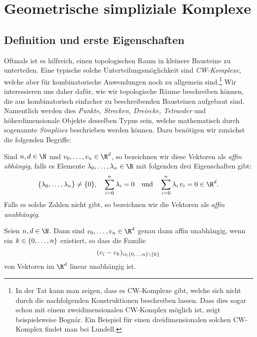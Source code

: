 \chapter{Geometrische simpliziale Komplexe}
\section{Definition und erste Eigenschaften} %
Oftmals ist es hilfreich, einen topologischen Raum in kleinere Bausteine zu
unterteilen. Eine typische solche Unterteilungsmöglichkeit sind \emph{CW-Komplexe}, welche
aber für kombinatorische Anwendungen noch zu allgemein sind.\footnote{%
    In der Tat kann man zeigen, dass es CW-Komplexe gibt, welche sich nicht
    durch die nachfolgenden Konstruktionen beschreiben lassen. Dass dies sogar
    schon mit einem zweidimensionalen CW-Komplex möglich ist, zeigt
    beispielsweise Bognár\cite{artcle:bognar77}. Ein Beispiel für einen
    dreidimensionalen solchen CW-Komplex findet man bei
    Lundell\cite[Ch.\,III,]{bookc:lundell69}.%
}
Wir interessieren uns daher dafür, wie wir topologische Räume beschreiben
können, die aus kombinatorisch einfacher zu beschreibenden Bausteinen aufgebaut
sind. Namentlich werden dies \emph{Punkte, Strecken, Dreiecke, Tetraeder} und
höherdimensionale Objekte desselben Typus sein, welche mathematisch durch
sogenannte \emph{Simplizes} beschrieben werden können. Dazu benötigen wir
zunächst die folgenden Begriffe:

\begin{thDef}
    Sind $n,d\in\N$ und $v_0,\ldots,v_n\in\R^d$, so bezeichnen wir diese
    Vektoren als \emph{affin abhängig}, falls es Elemente
    $\lambda_0,\ldots,\lambda_n \in\R$ mit folgenden drei Eigenschaften gibt:
    \[ \{\lambda_0,\ldots,\lambda_n\} \neq \{0\}, \quad \isum^n \lambda_i = 0
    \qundq \isum^n \lambda_i\,v_i = 0 \in\R^d.\] 
    Falls es solche Zahlen nicht gibt, so bezeichnen wir die Vektoren als
    \emph{affin unabhängig}.
\end{thDef}

\begin{thLemma}
    \label{gsc:iffaffinlyindependet}
    Seien $n,d\in\N$. Dann sind $v_0,\ldots,v_n\in\R^d$ genau dann affin
    unabhängig, wenn ein $k\in\{0,\ldots,n\}$ existiert, so dass die Familie
    \[  (v_i - v_k)_{i \in\{0,\ldots,n\}\setminus\{k\}} \] 
    von Vektoren im $\R^d$ linear unabhängig ist.
\end{thLemma}

